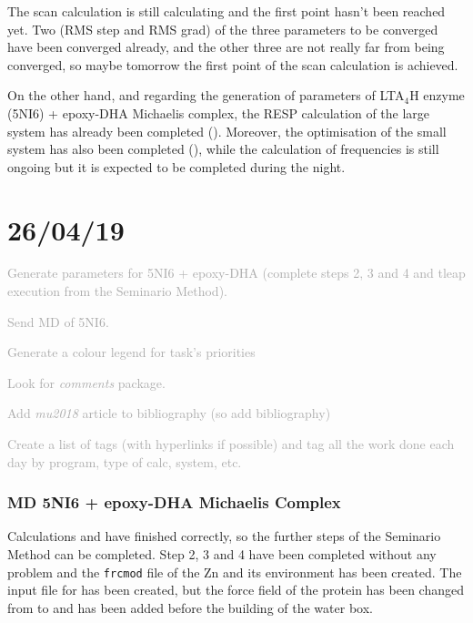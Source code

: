 \Hydroxilation
	
	The scan calculation  is still calculating and the first point hasn't been reached yet. Two (RMS step and RMS grad) of the three parameters to be converged have been converged already, and the other three are not really far from being converged, so maybe tomorrow the first point of the scan calculation is achieved.
	
	On the other hand, and regarding the generation of parameters of LTA$_4$H enzyme (5NI6) + epoxy-DHA Michaelis complex, the RESP calculation of the large system has already been completed (). Moreover, the optimisation of the small system has also been completed (), while the calculation of frequencies is still ongoing but it is expected to be completed during the night.
	
	

\section{26/04/19}\label{day:190426}

\Tasks

	\textcolor{darkgray}{
	\begin{todolist}
		\item[\done] Generate parameters for 5NI6 + epoxy-DHA (complete steps 2, 3 and 4 and tleap execution from the Seminario Method).
		\item[\done] Send MD of 5NI6.
		\item Generate a colour legend for task's priorities
		\item Look for \emph{comments} package.
		\item Add \emph{mu2018} article to bibliography (so add bibliography)
		\item Create a list of tags (with hyperlinks if possible) and tag all the work done each day by program, type of calc, system, etc.
	\end{todolist}
	}
	
	
\Hydroxilation
{}

	\subsubsection{MD 5NI6 + epoxy-DHA Michaelis Complex}
		Calculations  and  have finished correctly, so the further steps of the Seminario Method can be completed. Step 2, 3 and 4 have been completed without any problem and the \texttt{frcmod} file of the Zn and its environment has been created. The input file for \tleap{} has been created, but the force field of the protein has been changed from  to  and  has been added before the building of the water box.
		
